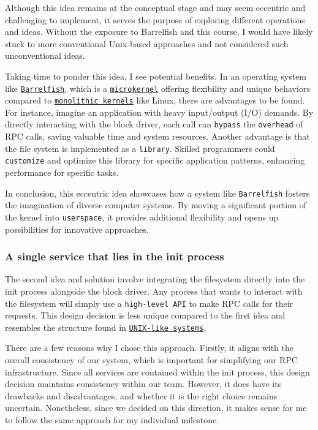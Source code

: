 {Although this idea remains at the conceptual stage and may seem eccentric and challenging to implement, it serves the purpose of exploring different operations and ideas. Without the exposure to Barrelfish and this course, I would have likely stuck to more conventional Unix-based approaches and not considered such unconventional ideas.

Taking time to ponder this idea, I see potential benefits. In an operating system like \href{https://barrelfish.org/}{\texttt{Barrelfish}}, which is a \href{https://en.wikipedia.org/wiki/Microkernel}{\texttt{microkernel}} offering flexibility and unique behaviors compared to \href{https://en.wikipedia.org/wiki/Monolithic_kernel}{\texttt{monolithic kernels}} like Linux, there are advantages to be found. For instance, imagine an application with heavy input/output (I/O) demands. By directly interacting with the block driver, each call can \texttt{bypass} the \texttt{overhead} of RPC calls, saving valuable time and system resources. Another advantage is that the file system is implemented as a \texttt{library}. Skilled programmers could \texttt{customize} and optimize this library for specific application patterns, enhancing performance for specific tasks.

In conclusion, this eccentric idea showcases how a system like \texttt{Barrelfish} fosters the imagination of diverse computer systems. By moving a significant portion of the kernel into \texttt{userspace}, it provides additional flexibility and opens up possibilities for innovative approaches.


\subsubsection{A single service that lies in the init process}

The second idea and solution involve integrating the filesystem directly into the init process alongside the block driver. Any process that wants to interact with the filesystem will simply use a \texttt{high-level API} to make RPC calls for their requests. This design decision is less unique compared to the first idea and resembles the structure found in \href{https://fr.wikipedia.org/wiki/Unix}{\texttt{UNIX-like systems}}.

There are a few reasons why I chose this approach. Firstly, it aligns with the overall consistency of our system, which is important for simplifying our RPC infrastructure. Since all services are contained within the init process, this design decision maintains consistency within our team. However, it does have its drawbacks and disadvantages, and whether it is the right choice remains uncertain. Nonetheless, since we decided on this direction, it makes sense for me to follow the same approach for my individual milestone.

}
